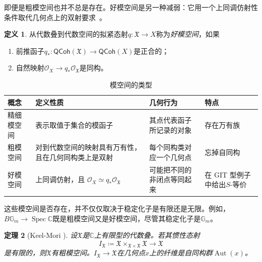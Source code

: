 \documentclass{amsart}
\newtheorem{thm}{定理}[section]
\theoremstyle{definition}
\newtheorem{defn}[thm]{定义}
\theoremstyle{remark}
\theoremstyle{plain}
\theoremstyle{definition}
\theoremstyle{remark}
\newcommand{\G}{\mathbb{G}}
\newcommand{\C}{\mathbb{C}}
\newcommand{\mc}[1]{\mathcal{#1}}
\newcommand{\mf}[1]{\mathfrak{#1}}
\newcommand{\on}[1]{\operatorname{#1}}
\newcommand{\ms}[1]{\mathsf{#1}}
\newcommand{\1}{\mathbf{1}}
\newcommand{\2}{\mathbf{2}}
\newcommand{\3}{\mathbf{3}}
\begin{document}
即便是粗模空间也并不总是存在。好模空间是另一种减弱：它用一个上同调仿射性条件取代几何点上的双射要求~\cite{Alper2013}。

\begin{defn}
    从代数叠到代数空间的拟紧态射\(q\colon\mf{X}\to X\)称为\textit{好模空间}，如果
    \begin{enumerate}
        \item 前推函子\(q_*\colon\ms{QCoh}(\mf{X})\to\ms{QCoh}(X)\)是正合的；
        \item 自然映射\(\mc{O}_X\to q_*\mc{O}_{\mf{X}}\)是同构。
    \end{enumerate}
\end{defn}

\begin{table}[htpb]
    \centering
    \caption{模空间的类型}
    \label{tab:moduli-types-corrected}
    \renewcommand{\arraystretch}{1.3}
    \begin{tabular}{
        p{}
        p{}
        p{}
        p{}
    }
        \toprule
        \textbf{概念}
        & \textbf{定义性质}
        & \textbf{几何行为}
        & \textbf{特点}
        \\
        \midrule
        精细模空间
        & 表示取值于集合的模函子
        & 其点代表函子所记录的对象
        & 存在万有族
        \\
        粗模空间
        & 对到代数空间的映射具有万有性，且在几何同构类上是双射
        & 每个同构类对应一个几何点
        & 忘掉自同构
        \\
        好模空间
        & 上同调仿射，且
          \(\mc{O}_X \simeq q_*\mc{O}_{\mf{X}}\)
        & 可能把不同的非闭点等同起来
        & 在 GIT 型例子中给出\(S\)-等价
        \\
        \bottomrule
    \end{tabular}
\end{table}

这些模空间是否存在，并不仅仅取决于稳定化子是有限还是无限。例如，\(B\G_m\to\on{Spec}\C\)既是粗模空间又是好模空间，尽管其稳定化子是\(\G_m\)。

\begin{thm}[Keel-Mori {\cite{KeelMori1997}}]
    设\(\mf{X}\)是\(\C\)上有限型的代数叠。若其惯性态射
    \[
        I_{\mf{X}}
        \coloneqq
        \mf{X}\times_{\mf{X}\times\mf{X}}\mf{X}
        \longrightarrow \mf{X}
    \]
    是有限的，则\(\mf{X}\)有粗模空间。\(I_{\mf{X}}\to\mf{X}\)在几何点\(x\)上的纤维是自同构群\(\on{Aut}(x)\)。
\end{thm}
\end{document}
